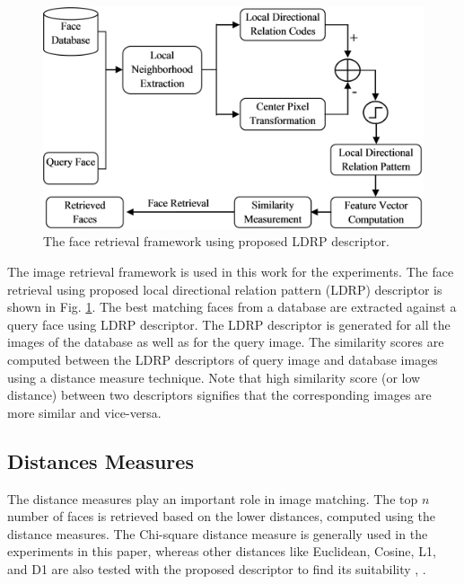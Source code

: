 \documentclass[a4paper]{article}
\begin{document}
\begin{figure}[!t]
    \centering
    \includegraphics[width=.99\linewidth]{4.png}
    \caption{The face retrieval framework using proposed LDRP descriptor.}
    \label{fig:setup}
\end{figure}

The image retrieval framework is used in this work for the experiments. The face retrieval using proposed local directional relation pattern (LDRP) descriptor is shown in Fig. \ref{fig:setup}. The best matching faces from a database are extracted against a query face using LDRP descriptor. The LDRP descriptor is generated for all the images of the database as well as for the query image. The similarity scores are computed between the LDRP descriptors of query image and database images using a distance measure technique. Note that high similarity score (or low distance) between two descriptors signifies that the corresponding images are more similar and vice-versa. 

\subsection{Distances Measures}
The distance measures play an important role in image matching. The top $n$ number of faces is retrieved based on the lower distances, computed using the distance measures. The Chi-square distance measure is generally used in the experiments in this paper, whereas other distances like Euclidean, Cosine, L1, and D1 are also tested with the proposed descriptor to find its suitability \cite{ltrp}, \cite{mdlbp}.
\end{document}
